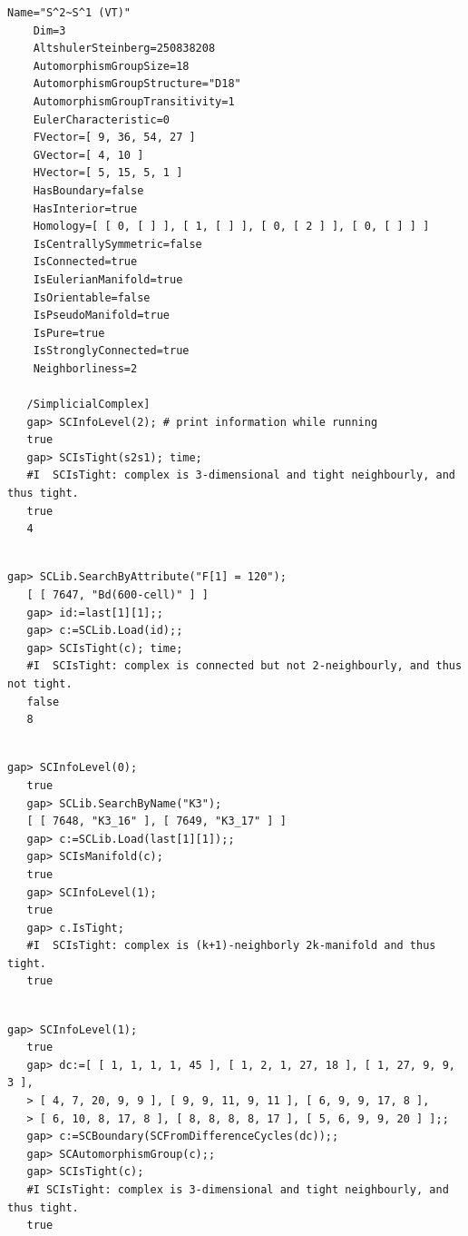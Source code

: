 \documentclass[a4paper,11pt]{report}
\begin{document}
{{{\begin{Verbatim}[commandchars=!@|,fontsize=\small,frame=single,label=Example]
    Name="S^2~S^1 (VT)"
    Dim=3
    AltshulerSteinberg=250838208
    AutomorphismGroupSize=18
    AutomorphismGroupStructure="D18"
    AutomorphismGroupTransitivity=1
    EulerCharacteristic=0
    FVector=[ 9, 36, 54, 27 ]
    GVector=[ 4, 10 ]
    HVector=[ 5, 15, 5, 1 ]
    HasBoundary=false
    HasInterior=true
    Homology=[ [ 0, [ ] ], [ 1, [ ] ], [ 0, [ 2 ] ], [ 0, [ ] ] ]
    IsCentrallySymmetric=false
    IsConnected=true
    IsEulerianManifold=true
    IsOrientable=false
    IsPseudoManifold=true
    IsPure=true
    IsStronglyConnected=true
    Neighborliness=2
   
   /SimplicialComplex]
   gap> SCInfoLevel(2); # print information while running
   true
   gap> SCIsTight(s2s1); time;
   #I  SCIsTight: complex is 3-dimensional and tight neighbourly, and thus tight.
   true
   4
   
\end{Verbatim}
 
\begin{Verbatim}[commandchars=!@|,fontsize=\small,frame=single,label=Example]
   gap> SCLib.SearchByAttribute("F[1] = 120");
   [ [ 7647, "Bd(600-cell)" ] ]
   gap> id:=last[1][1];;
   gap> c:=SCLib.Load(id);;
   gap> SCIsTight(c); time;
   #I  SCIsTight: complex is connected but not 2-neighbourly, and thus not tight.
   false
   8
   
\end{Verbatim}
 
\begin{Verbatim}[commandchars=!@|,fontsize=\small,frame=single,label=Example]
   gap> SCInfoLevel(0);
   true
   gap> SCLib.SearchByName("K3");  
   [ [ 7648, "K3_16" ], [ 7649, "K3_17" ] ]
   gap> c:=SCLib.Load(last[1][1]);;
   gap> SCIsManifold(c);
   true
   gap> SCInfoLevel(1);
   true
   gap> c.IsTight;                 
   #I  SCIsTight: complex is (k+1)-neighborly 2k-manifold and thus tight.
   true
   
\end{Verbatim}
 
\begin{Verbatim}[commandchars=!@|,fontsize=\small,frame=single,label=Example]
   gap> SCInfoLevel(1);
   true
   gap> dc:=[ [ 1, 1, 1, 1, 45 ], [ 1, 2, 1, 27, 18 ], [ 1, 27, 9, 9, 3 ], 
   > [ 4, 7, 20, 9, 9 ], [ 9, 9, 11, 9, 11 ], [ 6, 9, 9, 17, 8 ], 
   > [ 6, 10, 8, 17, 8 ], [ 8, 8, 8, 8, 17 ], [ 5, 6, 9, 9, 20 ] ];;
   gap> c:=SCBoundary(SCFromDifferenceCycles(dc));;
   gap> SCAutomorphismGroup(c);;
   gap> SCIsTight(c);
   #I SCIsTight: complex is 3-dimensional and tight neighbourly, and thus tight.
   true
   

\end{Verbatim}}}}
\end{document}
